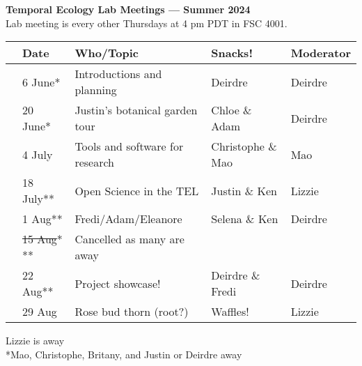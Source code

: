 \documentclass[11pt]{article}
\begin{document}
 
\raggedright
{}

\begin{center} 
{\large \textbf{Temporal Ecology Lab Meetings --- Summer 2024}} \\ [2pt]
Lab meeting is every other Thursdays at 4 pm PDT in FSC 4001.\\ %
\end{center} 

\begin{center}
\begin{tabular}{ p{0.2 cm}  p{2 cm}  p{5 cm}  p{3 cm}  p{3 cm} }  \hline \hline
 & \textbf{Date}
   & \textbf{Who/Topic}
      & \textbf{Snacks!} 
         & \textbf{Moderator} \\ 
\hline \hline
& 6 June* & Introductions and planning  &   Deirdre    & Deirdre\\\hline
& 20 June* &  Justin's botanical garden tour  &  Chloe \& Adam &  Deirdre \\\hline
& 4 July &  Tools and software for research & Christophe \& Mao &  Mao\\\hline  
& 18 July** &  Open Science in the TEL &  Justin \&  Ken &  Lizzie \\\hline
& 1 Aug**  & Fredi/Adam/Eleanore &  Selena \& Ken &  Deirdre \\\hline 
& \sout{15 Aug}* ** &   Cancelled as many are away &  &  \\\hline
& 22 Aug** &   Project showcase! & Deirdre \& Fredi &  Deirdre \\\hline
& 29 Aug &  Rose bud thorn (root?) & Waffles! & Lizzie\\\hline 
\hline
\end{tabular}
\end{center}
\noindent *Lizzie is away \\
\noindent **Mao, Christophe, Britany, and Justin or Deirdre away
\end{document}

